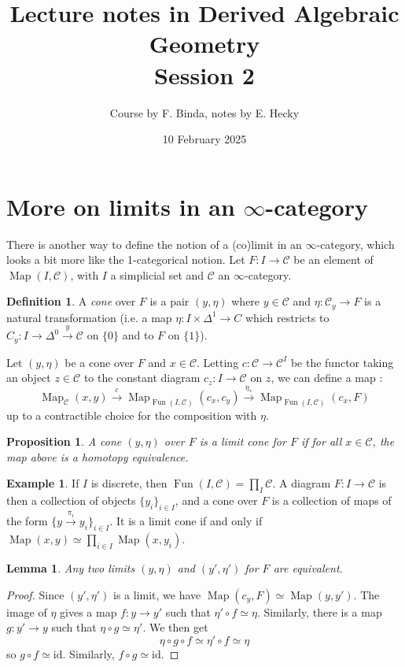 \documentclass[11pt]{article}
\title{Lecture notes in Derived Algebraic Geometry\\Session 2}
\date{10 February 2025}
\author{Course by F. Binda, notes by E. Hecky}
\newtheorem{proposition}{Proposition}
\newtheorem{lemma}{Lemma}
\theoremstyle{definition}
\newtheorem{definition}{Definition}
\newtheorem{example}{Example}
\newcommand{\C}{\mathcal{C}}
\newcommand{\Fun}{\operatorname{Fun}}
\newcommand{\Map}{\operatorname{Map}}
\begin{document}
\maketitle

\section{More on limits in an $\infty$-category}

There is another way to define the notion of a (co)limit in an $\infty$-category, which looks a bit more like the 1-categorical notion.
Let $F : I \to \C$ be an element of $\Map(I, \C)$, with $I$ a simplicial set and $\C$ an $\infty$-category.
\begin{definition}
    A \emph{cone} over $F$ is a pair $(y, \eta)$ where $y \in \C$ and $\eta : \C_y \to F$ is a natural transformation (i.e. a map $\eta : I \times \Delta^1 \to C$ which restricts to $C_y : I \to \Delta^0 \xrightarrow{y} \C$ on $\{0\}$ and to $F$ on $\{1\}$).
\end{definition}

Let $(y, \eta)$ be a cone over $F$ and $x \in \C$.
Letting $c : \C \to \C^I$ be the functor taking an object $z \in \C$ to the constant diagram $c_z : I \to \C$ on $z$, we can define a map :
\[
    \Map_{\C}(x, y) \xrightarrow{c} \Map_{\Fun(I, \C)}(c_x, c_y) \xrightarrow{\eta_*} \Map_{\Fun(I, \C)}(c_x, F)
\]
up to a contractible choice for the composition with $\eta$.

\begin{proposition}
    A cone $(y, \eta)$ over $F$ is a limit cone for $F$ if for all $x \in \C$, the map above is a homotopy equivalence.
\end{proposition}

\begin{example}
    If $I$ is discrete, then $\Fun(I, \C) = \prod_I \C$.
    A diagram $F : I \to \C$ is then a collection of objects $\{y_i\}_{i \in I}$, and a cone over $F$ is a collection of maps of the form $\{y \xrightarrow{\pi_i} y_i\}_{i \in I}$.
    It is a limit cone if and only if $\Map(x, y) \simeq \prod_{i \in I} \Map(x, y_i)$.
\end{example}

\begin{lemma}
    Any two limits $(y, \eta)$ and $(y', \eta')$ for $F$ are equivalent.
\end{lemma}
\begin{proof}
    Since $(y', \eta')$ is a limit, we have $\Map(c_y, F) \simeq \Map(y, y')$.
    The image of $\eta$ gives a map $f : y \to y'$ such that $\eta' \circ f \simeq \eta$.
    Similarly, there is a map $g : y' \to y$ such that $\eta \circ g \simeq \eta'$.
    We then get
    \[
        \eta \circ g \circ f \simeq \eta' \circ f \simeq \eta
    \]
    so $g \circ f \simeq \mathrm{id}$. Similarly, $f \circ g \simeq \mathrm{id}$.
\end{proof}
\end{document}
